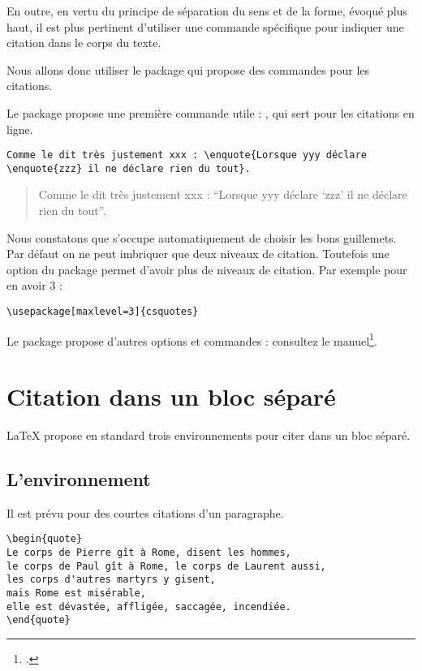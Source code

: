 En outre, en vertu du principe de séparation du sens et de la forme, évoqué plus haut, il est plus pertinent d'utiliser une commande spécifique pour indiquer une citation dans le corps du texte.

Nous allons donc utiliser le package  qui propose des commandes  pour les citations.



Le package propose une première commande utile : , qui sert pour les citations en ligne.

\begin{verbatim}
Comme le dit très justement xxx : \enquote{Lorsque yyy déclare \enquote{zzz} il ne déclare rien du tout}.
\end{verbatim}


\begin{quotation}
Comme le dit très justement xxx : \enquote{Lorsque yyy déclare \enquote{zzz} il ne déclare rien du tout}.
\end{quotation}


Nous constatons que  s'occupe automatiquement de choisir les bons guillemets. Par défaut on ne peut imbriquer que deux niveaux de citation. Toutefois une option du package permet d'avoir plus de niveaux de citation. Par exemple pour en avoir 3 : 

\begin{verbatim}
\usepackage[maxlevel=3]{csquotes}
\end{verbatim}

Le package propose d'autres options et commandes : consultez le manuel\footcite{csquotes}.

\section{Citation dans un bloc séparé}


LaTeX propose en standard trois environnements pour citer dans un bloc séparé.

\subsection{L'environnement }

Il est prévu pour des courtes citations d'un paragraphe.

\begin{verbatim}
\begin{quote}
Le corps de Pierre gît à Rome, disent les hommes,
le corps de Paul gît à Rome, le corps de Laurent aussi,
les corps d'autres martyrs y gisent,
mais Rome est misérable,
elle est dévastée, affligée, saccagée, incendiée.
\end{quote}
\end{verbatim}


